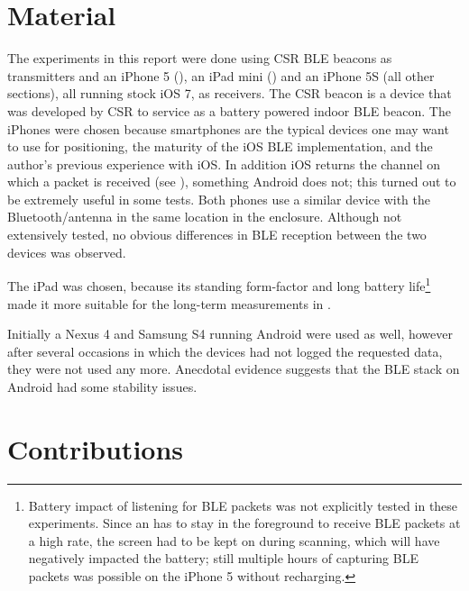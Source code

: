 \section{Material}
The experiments in this report were done using CSR BLE beacons as transmitters and an iPhone 5 (), an iPad mini () and an iPhone 5S (all other sections), all running stock iOS 7, as receivers.
The CSR beacon is a device that was developed by CSR to service as a battery powered indoor BLE beacon.
The iPhones were chosen because smartphones are the typical devices one may want to use for positioning, the maturity of the iOS BLE implementation, and the author's previous experience with iOS.
In addition iOS returns the channel on which a packet is received (see ), something Android does not; this turned out to be extremely useful in some tests.
Both phones use a similar device with the Bluetooth/\wifi antenna in the same location in the enclosure.
Although not extensively tested, no obvious differences in BLE reception between the two devices was observed.

The iPad was chosen, because its standing form-factor and long battery life\footnote{Battery impact of listening for BLE packets was not explicitly tested in these experiments. Since an \app has to stay in the foreground to receive BLE packets at a high rate, the screen had to be kept on during scanning, which will have negatively impacted the battery; still multiple hours of capturing BLE packets was possible on the iPhone 5 without recharging.} made it more suitable for the long-term measurements in .

Initially a Nexus 4 and Samsung S4 running Android were used as well, however after several occasions in which the devices had not logged the requested data, they were not used any more.
Anecdotal evidence suggests that the BLE stack on Android had some stability issues.

\section{Contributions}

